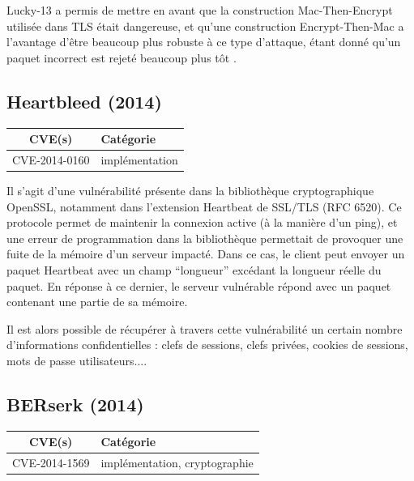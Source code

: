 Lucky-13 a permis de mettre en avant que la construction Mac-Then-Encrypt utilisée dans TLS était dangereuse, et qu'une construction Encrypt-Then-Mac a l'avantage d'être beaucoup plus robuste à ce type d'attaque, étant donné qu'un paquet incorrect est rejeté beaucoup plus tôt \cite{lucky13}.



\subsection{Heartbleed (2014)}

\begin{tabularx}{0.96\textwidth}{|c|X|}
  \hline
  \textbf{CVE(s)} & \textbf{Catégorie} \\
  \hline
  CVE-2014-0160 & implémentation \\
  \hline
\end{tabularx}

\vspace{1em}

Il s'agit d'une vulnérabilité présente dans la bibliothèque cryptographique OpenSSL, notamment dans l'extension Heartbeat de SSL/TLS (RFC 6520). Ce protocole permet de maintenir la connexion active (à la manière d'un ping), et une erreur de programmation dans la bibliothèque permettait de provoquer une fuite de la mémoire d'un serveur impacté. Dans ce cas, le client peut envoyer un paquet Heartbeat avec un champ ``longueur'' excédant la longueur réelle du paquet. En réponse à ce dernier, le serveur vulnérable répond avec un paquet contenant une partie de sa mémoire.

Il est alors possible de récupérer à travers cette vulnérabilité un certain nombre d'informations confidentielles : clefs de sessions, clefs privées, cookies de sessions, mots de passe utilisateurs...\cite{heartbleed}.




\subsection{BERserk (2014)}

\begin{tabularx}{0.96\textwidth}{|c|X|}
  \hline
  \textbf{CVE(s)} & \textbf{Catégorie} \\
  \hline
  CVE-2014-1569 & implémentation, cryptographie \\
  \hline
\end{tabularx}

